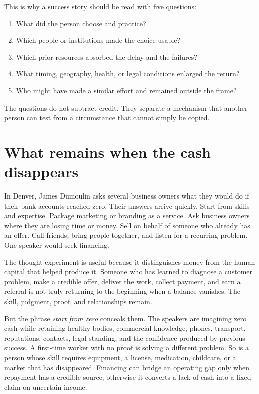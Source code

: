 This is why a success story should be read with five questions:

\begin{enumerate}
\item What did the person choose and practice?
\item Which people or institutions made the choice usable?
\item Which prior resources absorbed the delay and the failures?
\item What timing, geography, health, or legal conditions enlarged the return?
\item Who might have made a similar effort and remained outside the frame?
\end{enumerate}

The questions do not subtract credit. They separate a mechanism that another
person can test from a circumstance that cannot simply be copied.

\section{What remains when the cash disappears}

In Denver, James Dumoulin asks several business owners what they would do if
their bank accounts reached zero. Their answers arrive quickly. Start from
skills and expertise. Package marketing or branding as a service. Ask business
owners where they are losing time or money. Sell on behalf of someone who
already has an offer. Call friends, bring people together, and listen for a
recurring problem. One speaker would seek financing.

The thought experiment is useful because it distinguishes money from the human
capital that helped produce it. Someone who has learned to diagnose a customer
problem, make a credible offer, deliver the work, collect payment, and earn a
referral is not truly returning to the beginning when a balance vanishes. The
skill, judgment, proof, and relationships remain.

But the phrase \emph{start from zero} conceals them. The speakers are imagining
zero cash while retaining healthy bodies, commercial knowledge, phones,
transport, reputations, contacts, legal standing, and the confidence produced
by previous success. A first-time worker with no proof is solving a different
problem. So is a person whose skill requires equipment, a license, medication,
childcare, or a market that has disappeared. Financing can bridge an operating
gap only when repayment has a credible source; otherwise it converts a lack of
cash into a fixed claim on uncertain income.

